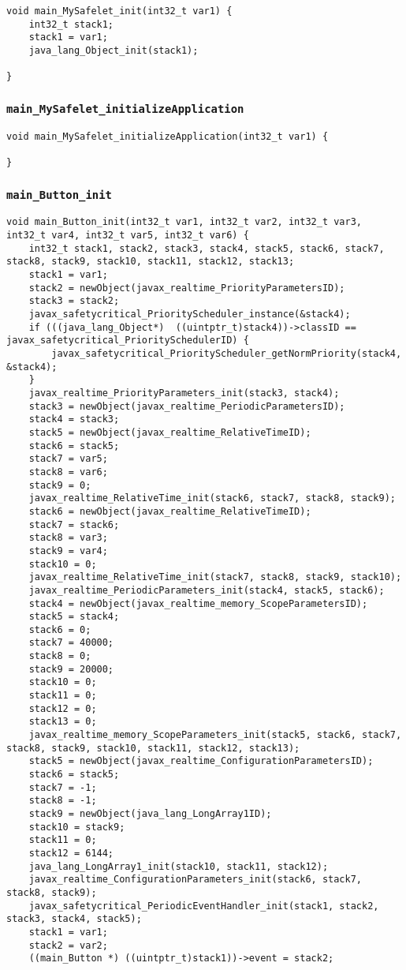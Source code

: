 \begin{landscape}
\begin{multicols}{2}
\begin{lstlisting}[firstnumber=1948]
void main_MySafelet_init(int32_t var1) {
	int32_t stack1;
	stack1 = var1;
	java_lang_Object_init(stack1);

}
\end{lstlisting}

\subsubsection{\texttt{main\_MySafelet\_initializeApplication}}

\begin{lstlisting}[firstnumber=2162]
void main_MySafelet_initializeApplication(int32_t var1) {
	
}
\end{lstlisting}

\subsubsection{\texttt{main\_Button\_init}}

\begin{lstlisting}[firstnumber=2208]
void main_Button_init(int32_t var1, int32_t var2, int32_t var3, int32_t var4, int32_t var5, int32_t var6) {
	int32_t stack1, stack2, stack3, stack4, stack5, stack6, stack7, stack8, stack9, stack10, stack11, stack12, stack13;
	stack1 = var1;
	stack2 = newObject(javax_realtime_PriorityParametersID);
	stack3 = stack2;
	javax_safetycritical_PriorityScheduler_instance(&stack4);
	if (((java_lang_Object*)  ((uintptr_t)stack4))->classID == javax_safetycritical_PrioritySchedulerID) {
		javax_safetycritical_PriorityScheduler_getNormPriority(stack4, &stack4);
	}
	javax_realtime_PriorityParameters_init(stack3, stack4);
	stack3 = newObject(javax_realtime_PeriodicParametersID);
	stack4 = stack3;
	stack5 = newObject(javax_realtime_RelativeTimeID);
	stack6 = stack5;
	stack7 = var5;
	stack8 = var6;
	stack9 = 0;
	javax_realtime_RelativeTime_init(stack6, stack7, stack8, stack9);
	stack6 = newObject(javax_realtime_RelativeTimeID);
	stack7 = stack6;
	stack8 = var3;
	stack9 = var4;
	stack10 = 0;
	javax_realtime_RelativeTime_init(stack7, stack8, stack9, stack10);
	javax_realtime_PeriodicParameters_init(stack4, stack5, stack6);
	stack4 = newObject(javax_realtime_memory_ScopeParametersID);
	stack5 = stack4;
	stack6 = 0;
	stack7 = 40000;
	stack8 = 0;
	stack9 = 20000;
	stack10 = 0;
	stack11 = 0;
	stack12 = 0;
	stack13 = 0;
	javax_realtime_memory_ScopeParameters_init(stack5, stack6, stack7, stack8, stack9, stack10, stack11, stack12, stack13);
	stack5 = newObject(javax_realtime_ConfigurationParametersID);
	stack6 = stack5;
	stack7 = -1;
	stack8 = -1;
	stack9 = newObject(java_lang_LongArray1ID);
	stack10 = stack9;
	stack11 = 0;
	stack12 = 6144;
	java_lang_LongArray1_init(stack10, stack11, stack12);
	javax_realtime_ConfigurationParameters_init(stack6, stack7, stack8, stack9);
	javax_safetycritical_PeriodicEventHandler_init(stack1, stack2, stack3, stack4, stack5);
	stack1 = var1;
	stack2 = var2;
	((main_Button *) ((uintptr_t)stack1))->event = stack2;


\end{lstlisting}
\end{multicols}
\end{landscape}
